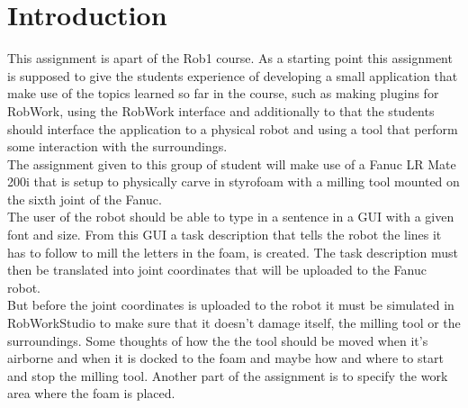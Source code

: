 \section{Introduction}
\label{sec:intro}

This assignment is apart of the Rob1 course. As a starting point this assignment is supposed to give the students experience of developing a small application that make use of the topics learned so far in the course, such as making plugins for RobWork, using the RobWork interface and additionally to that the students should interface the application to a physical robot and using a tool that perform some interaction with the surroundings.
\\The assignment given to this group of student will make use of a Fanuc LR Mate 200i that is setup to physically carve in styrofoam with a milling tool mounted on the sixth joint of the Fanuc.
\\The user of the robot should be able to type in a sentence in a GUI with a given font and size. From this GUI a task description that tells the robot the lines it has to follow to mill the letters in the foam, is created. The task description must then be translated into joint coordinates that will be uploaded to the Fanuc robot.
\\But before the joint coordinates is uploaded to the robot it must be simulated in RobWorkStudio to make sure that it doesn't damage itself, the milling tool or the surroundings. Some thoughts of how the the tool should be moved when it's airborne and when it is docked to the foam and maybe how and where to start and stop the milling tool. Another part of the assignment is to specify the work area where the foam is placed.